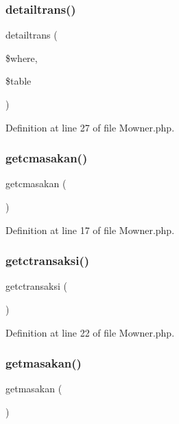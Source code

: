 \subsubsection{\texorpdfstring{detailtrans()}{detailtrans()}}
{\footnotesize\ttfamily detailtrans (\begin{DoxyParamCaption}\item[{}]{\$where,  }\item[{}]{\$table }\end{DoxyParamCaption})}



Definition at line 27 of file Mowner.\+php.

\mbox{\label{class_mowner_a9d032035c2608fe02d59175884d5bedf}} 
\subsubsection{\texorpdfstring{getcmasakan()}{getcmasakan()}}
{\footnotesize\ttfamily getcmasakan (\begin{DoxyParamCaption}{ }\end{DoxyParamCaption})}



Definition at line 17 of file Mowner.\+php.

\mbox{\label{class_mowner_a29406a8996c33e2ae572dcd11634af8c}} 
\subsubsection{\texorpdfstring{getctransaksi()}{getctransaksi()}}
{\footnotesize\ttfamily getctransaksi (\begin{DoxyParamCaption}{ }\end{DoxyParamCaption})}



Definition at line 22 of file Mowner.\+php.

\mbox{\label{class_mowner_af6cb3909c84d55dc39b68e22ad1c7ad3}} 
\subsubsection{\texorpdfstring{getmasakan()}{getmasakan()}}
{\footnotesize\ttfamily getmasakan (\begin{DoxyParamCaption}{ }\end{DoxyParamCaption})}



